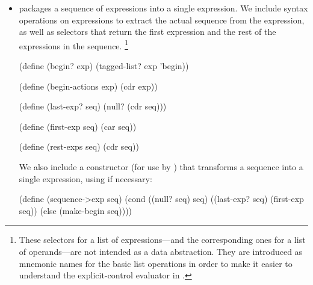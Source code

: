 \begin{itemize}[leftmargin=*]
		\begin{scheme}
		  (define (if? exp) (tagged-list? exp 'if))

		  (define (if-predicate exp) (cadr exp))

		  (define (if-consequent exp) (caddr exp))

		  (define (if-alternative exp)
		    (if (not (null? (cdddr exp)))
		        (cadddr exp)
		        'false))
		\end{scheme}

		We also provide a constructor for  expressions, to be used by  to transform  expressions into  expressions:

		\begin{scheme}
		  (define (make-if predicate consequent alternative)
		    (list 'if predicate consequent alternative))
		\end{scheme}

	\item
		 packages a sequence of expressions into a single expression.
		We include syntax operations on  expressions to extract the actual sequence from the  expression, as well as selectors that return the first expression and the rest of the expressions in the sequence.%
		\footnote{
			These selectors for a list of expressions---and the corresponding ones for a list of operands---are not intended as a data abstraction.
			They are introduced as mnemonic names for the basic list operations in order to make it easier to understand the explicit-control evaluator in .
		}

		\begin{scheme}
		  (define (begin? exp) (tagged-list? exp 'begin))

		  (define (begin-actions exp) (cdr exp))

		  (define (last-exp? seq) (null? (cdr seq)))

		  (define (first-exp seq) (car seq))

		  (define (rest-exps seq) (cdr seq))
		\end{scheme}

		We also include a constructor  (for use by ) that transforms a sequence into a single expression, using  if necessary:

		\begin{scheme}
		  (define (sequence->exp seq)
		    (cond ((null? seq) seq)
		          ((last-exp? seq) (first-exp seq))
		          (else (make-begin seq))))


\end{scheme}
\end{itemize}
